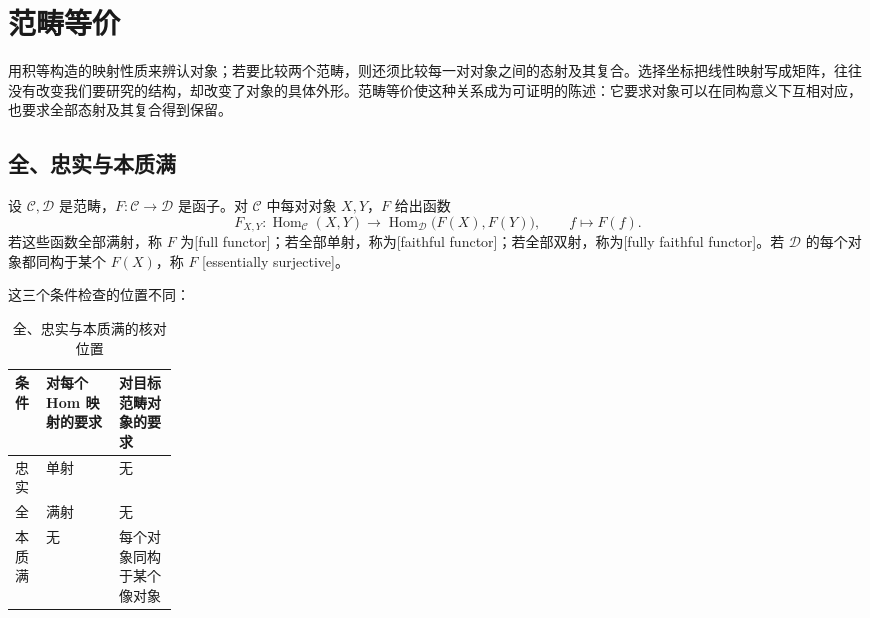 
\section{范畴等价}
\label{b2:sec:0504}

用积等构造的映射性质来辨认对象；若要比较两个范畴，则还须比较每一对对象之间的态射及其复合。选择坐标把线性映射写成矩阵，往往没有改变我们要研究的结构，却改变了对象的具体外形。范畴等价使这种关系成为可证明的陈述：它要求对象可以在同构意义下互相对应，也要求全部态射及其复合得到保留。

%
%
%

\subsection{全、忠实与本质满}
\label{b2:subsec:0504:01}

\begin{definition}\label{b2:def:fully-faithful-essentially-surjective}
	设 \(\mathcal C,\mathcal D\) 是范畴，\(F:\mathcal C\rightarrow\mathcal D\) 是函子。对 \(\mathcal C\) 中每对对象 \(X,Y\)，\(F\) 给出函数
	\[
		F_{X,Y}:\operatorname{Hom}_{\mathcal C}(X,Y)\longrightarrow \operatorname{Hom}_{\mathcal D}\bigl(F(X),F(Y)\bigr),\qquad f\longmapsto F(f).
	\]
	若这些函数全部满射，称 \(F\) 为[full functor]；若全部单射，称为[faithful functor]；若全部双射，称为[fully faithful functor]。若 \(\mathcal D\) 的每个对象都同构于某个 \(F(X)\)，称 \(F\) [essentially surjective]。
\end{definition}

这三个条件检查的位置不同：
\begin{table}[htbp]
	\centering
	\caption{全、忠实与本质满的核对位置}\label{b2:tab:functor-equivalence-conditions}
	\begin{tabularx}{\linewidth}{@{}p{0.19\linewidth}X X@{}}
		\toprule
		条件 & 对每个 Hom 映射的要求 & 对目标范畴对象的要求 \\
		\midrule
		忠实 & 单射 & 无 \\
		全 & 满射 & 无 \\
		本质满 & 无 & 每个对象同构于某个像对象 \\
		\bottomrule
	\end{tabularx}
\end{table}

